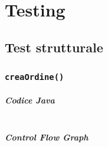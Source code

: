 \chapter{Testing}

\section{Test strutturale}

\subsection{\texttt{creaOrdine()}}

\paragraph{Codice Java}

\inputminted[breaklines,tabsize=4,linenos]{java}{chapters/testing_white_box/creaOrdine.java}

\vfill

\pagebreak

\paragraph{Control Flow Graph}\mbox{}\newline

